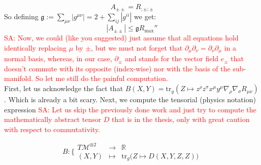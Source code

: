\documentclass[a4paper,11pt]{article}
\numberwithin{equation}{section}
\theoremstyle{definition}
\newcommand{\SA}[1]{\textcolor{red}{SA: #1}}
\begin{document}
\begin{equation}
    \boxed{A_{\pm\pm} = R_{;\pm;\pm}}
\end{equation}
So defining $\mathfrak{g}:= \sum_{\mu\nu} |g^{\mu\nu}|= 2 + \sum_{ij} |g^{ii}|$ we get:
\begin{equation}
    |A_{\pm\pm}| \leq \mathfrak{g} R_\mathrm{max}''
\end{equation}
\SA{Now, we could (like you suggested) just assume that all equations hold identically replacing $\mu$ by $\pm$, but we must not forget that $\partial_\mu\partial_\nu=\partial_\nu\partial_\mu$ in a normal basis, whereas, in our case, $\partial_\pm$ and stands for the vector field $e_\pm$ that doesn't commute with its opposite (index-wise) nor with the basis of the sub-manifold. So let me still do the painful computation.}
\\
First, let us acknowledge the fact that $B(X,Y)=\mathrm{tr}_g(Z\mapsto z^\rho z^\sigma x^\mu y^\mu \nabla_\rho \nabla_\sigma R_{\mu\nu})$. Which is already a bit scary. Next, we compute the tensorial (physics notation) expression
\SA{Let us skip the previously done work and just try to compute the mathematically abstract tensor $D$ that is in the thesis, only with great caution with respect to commutativity.}

\begin{equation}
    B:\bigg\{ \begin{matrix}
        T\mathcal{M}^{\otimes 2} & \to & \mathbb{R}\\
        (X,Y) & \mapsto & \mathrm{tr}_g \big(Z \mapsto D(X,Y,Z,Z)\big)
    \end{matrix}
\end{equation}
\end{document}
